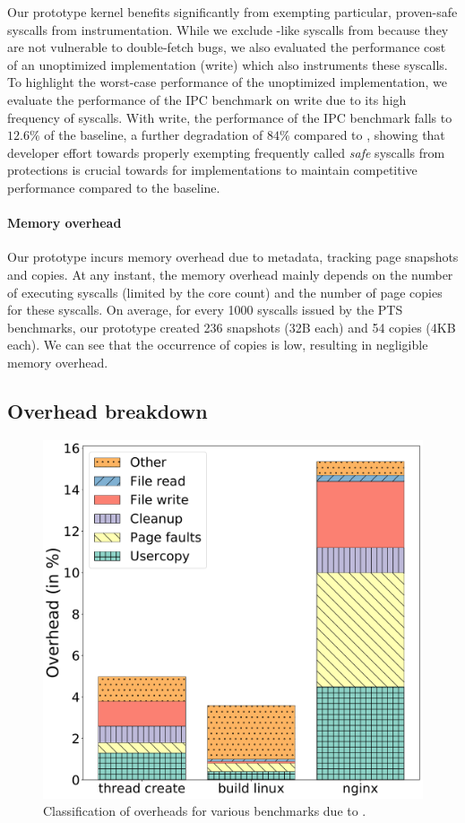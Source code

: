 Our prototype \midas kernel benefits significantly from
exempting particular, proven-safe syscalls from instrumentation.
While we exclude -like syscalls from \midas because they
are not vulnerable to double-fetch bugs, we also evaluated the
performance cost of an unoptimized implementation (\midas{+}write)
which also instruments these syscalls.
To highlight the worst-case performance of the unoptimized implementation,
we evaluate the performance of the IPC benchmark on \midas{+}write due
to its high frequency of  syscalls.
With \midas{+}write, the performance of the IPC benchmark falls to
$12.6\%$ of the baseline, a further degradation of $84\%$ compared
to \midas, showing that developer effort towards properly exempting
frequently called \emph{safe} syscalls from \midas protections is crucial
towards for implementations to maintain competitive performance
compared to the baseline.

\paragraph{Memory overhead}
Our prototype incurs memory overhead due to metadata, tracking page snapshots
and copies.
At any instant, the memory overhead mainly depends on the number of executing
syscalls (limited by the core count) and the number of page copies for these
syscalls.
On average, for every 1000 syscalls issued by the PTS benchmarks, our prototype
created 236 snapshots (32B each) and 54 copies (4KB each).
We can see that the occurrence of copies is low, resulting in negligible
memory overhead.

\subsection{Overhead breakdown}

\begin{figure}
  \centering
  \includegraphics[width=0.7\linewidth]{media/midas/overhead.pdf}
  \caption{Classification of overheads for various benchmarks due to \midas.}
  \label{fig:midas:overhead_class}
\end{figure}

